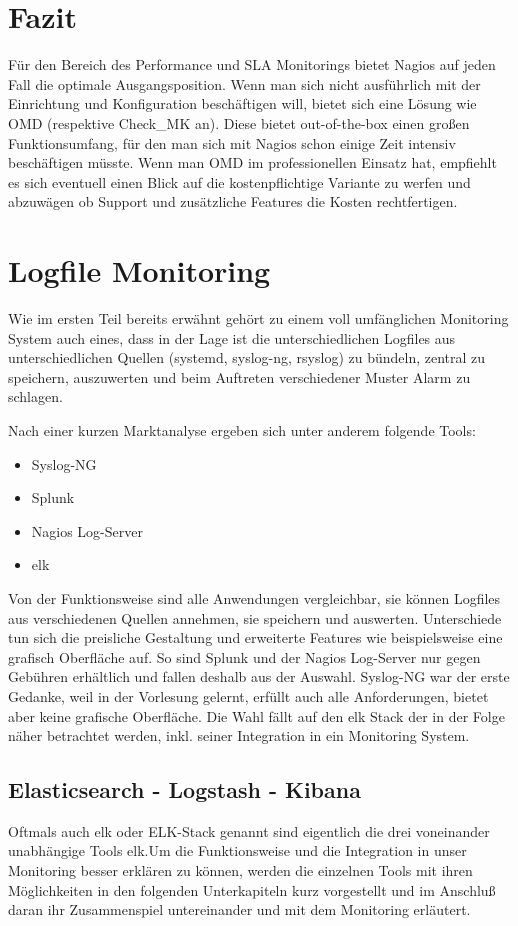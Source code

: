 \documentclass[12pt,a4paper,parskip,listof=totoc,bibliography=totoc]{scrreprt}
\begin{document}
	\section{Fazit}
	Für den Bereich des Performance und SLA Monitorings bietet Nagios auf jeden Fall die optimale Ausgangsposition. Wenn man sich nicht ausführlich mit der Einrichtung und Konfiguration beschäftigen will, bietet sich eine Lösung wie OMD (respektive Check\_MK an). Diese bietet out-of-the-box einen großen Funktionsumfang, für den man sich mit Nagios schon einige Zeit intensiv beschäftigen müsste. Wenn man OMD im professionellen Einsatz hat, empfiehlt es sich eventuell einen Blick auf die kostenpflichtige Variante zu werfen und abzuwägen ob Support und zusätzliche Features die Kosten rechtfertigen.
	\section{Logfile Monitoring}
	Wie im ersten Teil bereits erwähnt gehört zu einem voll umfänglichen Monitoring System auch eines, dass in der Lage ist die unterschiedlichen Logfiles aus unterschiedlichen Quellen (systemd, syslog-ng, rsyslog) zu bündeln, zentral zu speichern, auszuwerten und beim Auftreten verschiedener Muster Alarm zu schlagen.
	
	Nach einer kurzen Marktanalyse ergeben sich unter anderem folgende Tools:
	\begin{itemize}
		\item Syslog-NG
		\item Splunk
		\item Nagios Log-Server
		\item \acrlong{elk}
	\end{itemize}
	Von der Funktionsweise sind alle Anwendungen vergleichbar, sie können Logfiles aus verschiedenen Quellen annehmen, sie speichern und auswerten. Unterschiede tun sich die preisliche Gestaltung und erweiterte Features wie beispielsweise eine grafisch Oberfläche auf. So sind Splunk und der Nagios Log-Server nur gegen Gebühren erhältlich und fallen deshalb aus der Auswahl. Syslog-NG war der erste Gedanke, weil in der Vorlesung gelernt, erfüllt auch alle Anforderungen, bietet aber keine grafische Oberfläche. Die Wahl fällt auf den \acrshort{elk} Stack der in der Folge näher betrachtet werden, inkl. seiner Integration in ein Monitoring System.
	
	\subsection{Elasticsearch - Logstash - Kibana}
	Oftmals auch \acrshort{elk} oder ELK-Stack genannt sind eigentlich die drei voneinander unabhängige Tools \acrlong{elk}.Um die Funktionsweise und die Integration in unser Monitoring besser erklären zu können, werden die einzelnen Tools mit ihren Möglichkeiten in den folgenden Unterkapiteln kurz vorgestellt und im Anschluß daran ihr Zusammenspiel untereinander und mit dem Monitoring erläutert.
\end{document}

